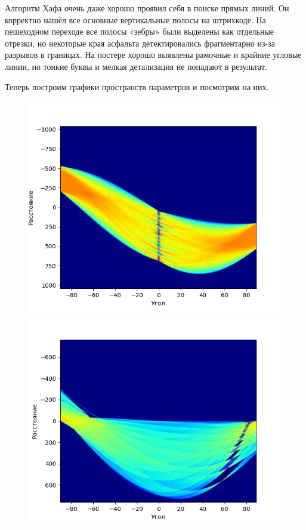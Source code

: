 \documentclass[a4paper,12pt]{article}
\begin{document}
\noindent Алгоритм Хафа очень даже хорошо проявил себя в поиске прямых линий. Он корректно нашёл все основные вертикальные полосы на штрихкоде. На пешеходном переходе все полосы «зебры» были выделены как отдельные отрезки, но некоторые края асфальта детектировались фрагментарно из-за разрывов в границах. На постере хорошо выявлены рамочные и крайние угловые линии, но тонкие буквы и мелкая детализация не попадают в результат. 

Теперь построим графики пространств параметров и посмотрим на них.
\begin{figure}[H]
    \centering
    \begin{minipage}{0.48\textwidth}
        \centering
        \includegraphics[width=\textwidth]{images/hough_lines/1_proc_accum.png}
    \end{minipage}
    \begin{minipage}{0.48\textwidth}
        \centering
        \includegraphics[width=\textwidth]{images/hough_lines/2_proc_accum.png}

\end{minipage}
\end{figure}
\end{document}
